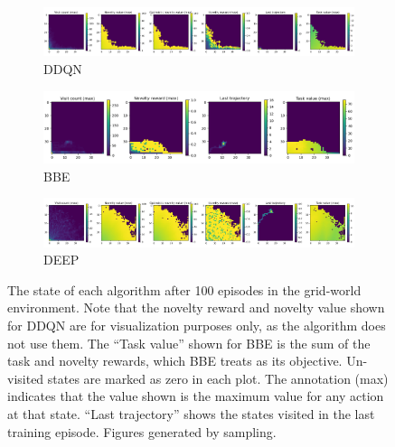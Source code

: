 \begin{figure}[h]
    \centering
    \begin{subfigure}[b]{\textwidth}
        \centering
        \includegraphics[height=0.15\textwidth]{figures/deep/gridworld_100_ddqn.png}
        \caption{DDQN}
    \end{subfigure}

    \begin{subfigure}[b]{\textwidth}
        \centering
        \includegraphics[height=0.15\textwidth]{figures/deep/gridworld_100_bbe.png}
        \caption{BBE}
    \end{subfigure}

    \begin{subfigure}[b]{\textwidth}
        \centering
        \includegraphics[height=0.15\textwidth]{figures/deep/gridworld_100_deep.png}
        \caption{DEEP}
    \end{subfigure}
    \caption{The state of each algorithm after 100 episodes in the grid-world environment.
        Note that the novelty reward and novelty value shown for DDQN are for visualization purposes only, as the algorithm does not use them.
        The ``Task value'' shown for BBE is the sum of the task and novelty rewards, which BBE treats as its objective.
        Un-visited states are marked as zero in each plot.
        The annotation (max) indicates that the value shown is the maximum value for any action at that state.
        ``Last trajectory'' shows the states visited in the last training episode.
        Figures generated by sampling.}
        \label{fig:gridworld_algorithm_states}
\end{figure}


 \label{sec:count_implementation}

